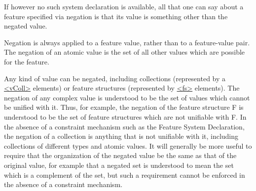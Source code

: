 If however no such system declaration is available, all that one can say about a feature specified via negation is that its value is something other than the negated value. \par
Negation is always applied to a feature value, rather than to a feature-value pair. The negation of an atomic value is the set of all other values which are possible for the feature. \par
Any kind of value can be negated, including collections (represented by a \hyperref[TEI.vColl]{<vColl>} elements) or feature structures (represented by \hyperref[TEI.fs]{<fs>} elements). The negation of any complex value is understood to be the set of values which cannot be unified with it. Thus, for example, the negation of the feature structure F is understood to be the set of feature structures which are not unifiable with F. In the absence of a constraint mechanism such as the Feature System Declaration, the negation of a collection is anything that is not unifiable with it, including collections of different types and atomic values. It will generally be more useful to require that the organization of the negated value be the same as that of the original value, for example that a negated set is understood to mean the set which is a complement of the set, but such a requirement cannot be enforced in the absence of a constraint mechanism.
